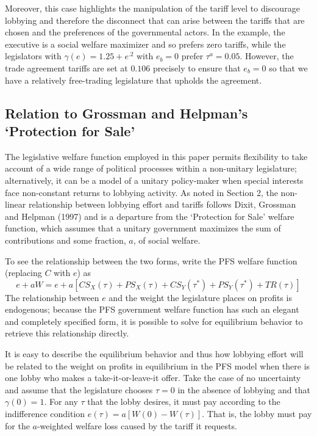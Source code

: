 \documentclass[10pt]{article}
\newcommand{\ga}{\gamma}
\begin{document}
Moreover, this case highlights the manipulation of the tariff level to discourage lobbying and therefore the disconnect that can arise between the tariffs that are chosen and the preferences of the governmental actors. In the example, the executive is a social welfare maximizer and so prefers zero tariffs, while the legislators with $\ga(e) = 1.25 + e^{.2}$ with $e_b = 0$ prefer $\tau^a = 0.05$. However, the trade agreement tariffs are set at $0.106$ precisely to ensure that $e_b =0$ so that we have a relatively free-trading legislature that upholds the agreement.


\subsection{Relation to Grossman and Helpman's `Protection for Sale'}
\label{sec:gh}
The legislative welfare function employed in this paper permits flexibility to take account of a wide range of political processes within a non-unitary legislature; alternatively, it can be a model of a unitary policy-maker when special interests face non-constant returns to lobbying activity. As noted in Section 2, the non-linear relationship between lobbying effort and tariffs follows Dixit, Grossman and Helpman (1997) and is a departure from the `Protection for Sale' welfare function, which assumes that a unitary government maximizes the sum of contributions and some fraction, $a$, of social welfare.

To see the relationship between the two forms, write the PFS welfare function (replacing $C$ with $e$) as
\[
  e + aW = e + a \left[ \mathit{CS}_X(\tau) + \mathit{PS}_X(\tau) + \mathit{CS}_Y(\tau^*) + \mathit{PS}_Y(\tau^*) + \mathit{TR}(\tau) \right]
\]
The relationship between $e$ and the weight the legislature places on profits is endogenous; because the PFS government welfare function has such an elegant and completely specified form, it is possible to solve for equilibrium behavior to retrieve this relationship directly.

It is easy to describe the equilibrium behavior and thus how lobbying effort will be related to the weight on profits in equilibrium in the PFS model when there is one lobby who makes a take-it-or-leave-it offer. Take the case of no uncertainty and assume that the legislature chooses $\tau=0$ in the absence of lobbying and that $\ga(0)=1$. For any $\tau$ that the lobby desires, it must pay according to the  indifference condition $e(\tau) = a \left[ W(0) - W(\tau) \right]$. That is, the lobby must pay for the $a$-weighted welfare loss caused by the tariff it requests.
\end{document}
